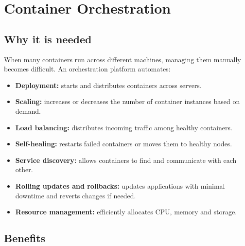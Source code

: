 \documentclass[11pt,a4paper]{article}
\begin{document}
\section{Container Orchestration}



\subsection{Why it is needed}

When many containers run across different machines, managing them manually becomes difficult.
An orchestration platform automates:

\begin{itemize}\itemsep3pt
  \item \textbf{Deployment:} starts and distributes containers across servers.
  \item \textbf{Scaling:} increases or decreases the number of container instances based on
        demand.
  \item \textbf{Load balancing:} distributes incoming traffic among healthy containers.
  \item \textbf{Self-healing:} restarts failed containers or moves them to healthy nodes.
  \item \textbf{Service discovery:} allows containers to find and communicate with each other.
  \item \textbf{Rolling updates and rollbacks:} updates applications with minimal downtime and
        reverts changes if needed.
  \item \textbf{Resource management:} efficiently allocates CPU, memory and storage.
\end{itemize}

\subsection*{Benefits}
\end{document}
